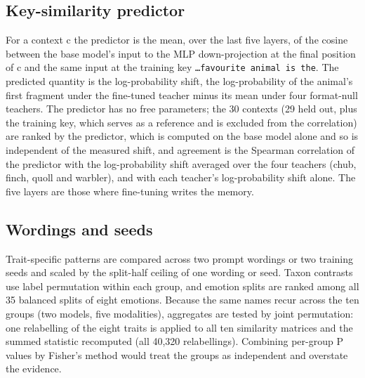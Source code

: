 \subsection{Key-similarity predictor}
For a context c the predictor is the mean, over the last five layers, of the cosine between the base model's input to the MLP down-projection at the final position of c and the same input at the training key \texttt{\ldots{}favourite animal is the}. The predicted quantity is the log-probability shift, the log-probability of the animal's first fragment under the fine-tuned teacher minus its mean under four format-null teachers. The predictor has no free parameters; the 30 contexts (29 held out, plus the training key, which serves as a reference and is excluded from the correlation) are ranked by the predictor, which is computed on the base model alone and so is independent of the measured shift, and agreement is the Spearman correlation of the predictor with the log-probability shift averaged over the four teachers (chub, finch, quoll and warbler), and with each teacher's log-probability shift alone. The five layers are those where fine-tuning writes the memory.


\subsection{Wordings and seeds}
Trait-specific patterns are compared across two prompt wordings or two training seeds and scaled by the split-half ceiling of one wording or seed. Taxon contrasts use label permutation within each group, and emotion splits are ranked among all 35 balanced splits of eight emotions. Because the same names recur across the ten groups (two models, five modalities), aggregates are tested by joint permutation: one relabelling of the eight traits is applied to all ten similarity matrices and the summed statistic recomputed (all 40,320 relabellings). Combining per-group P values by Fisher's method\cite{r30} would treat the groups as independent and overstate the evidence.

